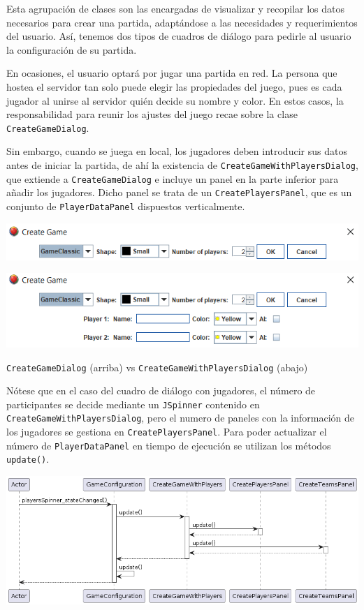 \documentclass[../DocumentoOficial.tex]{subfiles}
\begin{document}
Esta agrupación de clases son las encargadas de visualizar y recopilar los datos necesarios para crear una partida, adaptándose a las necesidades y requerimientos del usuario. Así, tenemos dos tipos de cuadros de diálogo para pedirle al usuario la configuración de su partida.

En ocasiones, el usuario optará por jugar una partida en red. La persona que hostea el servidor tan solo puede elegir las propiedades del juego, pues es cada jugador al unirse al servidor quién decide su nombre y color. En estos casos, la responsabilidad para reunir los ajustes del juego recae sobre la clase \texttt{CreateGameDialog}.

Sin embargo, cuando se juega en local, los jugadores deben introducir sus datos antes de iniciar la partida, de ahí la existencia de \texttt{CreateGameWithPlayersDialog}, que extiende a \texttt{CreateGameDialog} e incluye un panel en la parte inferior para añadir los jugadores. Dicho panel se trata de un \texttt{CreatePlayersPanel}, que es un conjunto de \texttt{PlayerDataPanel} dispuestos verticalmente.

\begin{center}
\includegraphics[scale=0.65]{create-game-sprint6.png}
\end{center}

\begin{center}
\includegraphics[scale=0.65]{create-game-players-sprint6.png}

\texttt{CreateGameDialog} (arriba) vs \texttt{CreateGameWithPlayersDialog} (abajo)
\end{center}

Nótese que en el caso del cuadro de diálogo con jugadores, el número de participantes se decide mediante un \texttt{JSpinner} contenido en \texttt{CreateGameWithPlayersDialog}, pero el numero de paneles con la información de los jugadores se gestiona en \texttt{CreatePlayersPanel}. Para poder actualizar el número de \texttt{PlayerDataPanel} en tiempo de ejecución se utilizan los métodos \texttt{update()}.
\begin{center}
\includegraphics[scale=0.41]{updateGameConfig.png}
\end{center}
\end{document}
